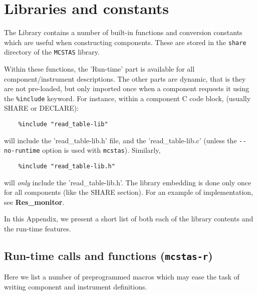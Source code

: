 
\def\textbfMCRC#1{\indexMCRC{#1}{textit}\textbf{#1}}
\def\textbfMCRH#1{\indexMCRH{#1}{textit}\textbf{#1}}
\def\textbfMCCC#1{\indexMCCC{#1}{textit}\textbf{#1}}
\def\textbfMCCH#1{\indexMCCH{#1}{textit}\textbf{#1}}
\def\textbfRTLC#1{\indexRTLC{#1}{textit}\textbf{#1}}

\chapter{Libraries and constants}
\label{c:kernelcalls}


The \MCS Library contains a number of built-in functions
and conversion constants which are useful when constructing
components. These are stored in the \verb+share+ directory of
the \verb+MCSTAS+ library. 

Within these functions, the 'Run-time' part is available for all
component/instrument descriptions. The other parts
are dynamic, that is they are not
pre-loaded, but only imported once when a component requests it
using the \verb+%include+ \MCS keyword. For instance, within a
component C code block, (usually SHARE or DECLARE):
\begin{lstlisting}
    %include "read_table-lib"
\end{lstlisting}
will include the 'read\_table-lib.h' file, and the 'read\_table-lib.c'
(unless the \verb+--no-runtime+ option is used with \verb+mcstas+).
Similarly,
\begin{lstlisting}
    %include "read_table-lib.h"
\end{lstlisting}
will \emph{only} include the 'read\_table-lib.h'.
The library embedding is done only once for all components (like the
 SHARE section).  For an example
of implementation, see \textbf{Res\_monitor}.

In this Appendix, we present a short list of both each of the library contents
and the run-time features.

\section{Run-time calls and functions (\texttt{mcstas-r})}
\label{s:calls:run-time}
Here we list a number of preprogrammed macros
which may ease the task of writing component and instrument definitions.

